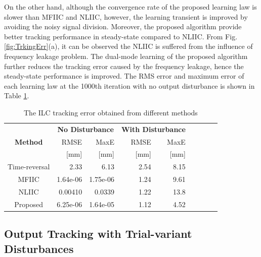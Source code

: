 \documentclass[a4paper, 12pt, twoside, openright]{mythesis}
\begin{document}
On the other hand, although the convergence rate of the proposed learning law is slower than MFIIC and NLIIC, however, the learning transient is improved by avoiding the noisy signal division. Moreover, the proposed algorithm provide better tracking performance in steady-state compared to NLIIC. From Fig. \ref{fig:TrkingErr}(a), it can be observed the NLIIC is suffered from the influence of frequency leakage problem. The dual-mode learning of the proposed algorithm further reduces the tracking error caused by the frequency leakage, hence the steady-state performance is improved. The RMS error and maximum error of each learning law at the 1000th iteration with no output disturbance is shown in Table \ref{tab:TrackingError}. 

\begin{table}[t]
\begin{center}
\caption{The ILC tracking error obtained from different methods}
\label{tab:TrackingError}
\begin{tabular}{|c|rr|rr|rr|rr|}
\hline
\textbf{}  & \multicolumn{2}{c|}{\textbf{No Disturbance}}                                                                             & \multicolumn{2}{c|}{\textbf{With Disturbance}}                                                                                    \\ \cline{2-5} 
\textbf{Method} &{RMSE} &{MaxE} &{RMSE} &{MaxE} \\ 
\textbf{} & [mm] & [mm] & [mm] & [mm] \\ \hline
Time-reversal   & 2.33      & 6.13   & 2.54 & 8.15    \\
MFIIC     & 1.64e-06         & 1.75e-06      & 1.24 & 9.61     \\
NLIIC    & 0.00410      & 0.0339     & 1.22     & 13.8 \\
Proposed  & 6.25e-06        & 1.64e-05       & 1.12 & 4.52          \\ \hline
\end{tabular}
\end{center}
\end{table}

\subsection{Output Tracking with Trial-variant Disturbances} 
 \label{sec: Output Tracking with Trial-variant Disturbances}
 
\end{document}
